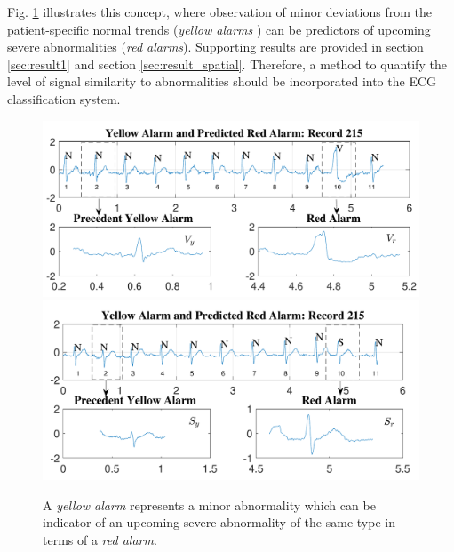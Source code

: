 Fig. \ref{fig:pred_signals} illustrates this concept, where observation of minor deviations from the patient-specific normal trends (\textit{yellow alarms} ) can be predictors of upcoming severe abnormalities (\textit{red alarms}). Supporting results are provided in section \ref{sec:result1} and section \ref{sec:result_spatial}. %
Therefore, a method to quantify the level of signal similarity to abnormalities should be incorporated into the ECG classification system.

 \begin{figure}[t]
 	\centering
 	\includegraphics[scale=0.6]{Fig/predicting_record215S_numbered.pdf}
 	\includegraphics[scale=0.62]{Fig/predicting_record215_numbered.pdf} 
 	\caption{A \textit{yellow alarm} represents a minor abnormality which can be indicator of an upcoming severe abnormality of the same type in terms of a \textit{red alarm}.}
 	\label{fig:pred_signals}
 \end{figure}




